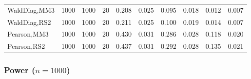\documentclass[
]{article}
\begin{document}
\begin{table}[H]
{\begin{tabular}[t]{lrrrrrrlrr}
\hspace{1em}WaldDiag,MM3 & 1000 & 1000 & 20 & 0.208 & 0.025 & 0.095 & 0.018 & 0.012 & 0.007\\
\hspace{1em}WaldDiag,RS2 & 1000 & 1000 & 20 & 0.211 & 0.025 & 0.100 & 0.019 & 0.014 & 0.007\\
\hspace{1em}Pearson,MM3 & 1000 & 1000 & 20 & 0.430 & 0.031 & 0.286 & 0.028 & 0.118 & 0.020\\
\hspace{1em}Pearson,RS2 & 1000 & 1000 & 20 & 0.437 & 0.031 & 0.292 & 0.028 & 0.135 & 0.021\\
\bottomrule
\end{tabular}}
\endgroup{}
\end{table}

\hypertarget{power-n1000-1}{%
\subsubsection{\texorpdfstring{Power
(\(n=1000\))}{Power (n=1000)}}\label{power-n1000-1}}
\end{document}

